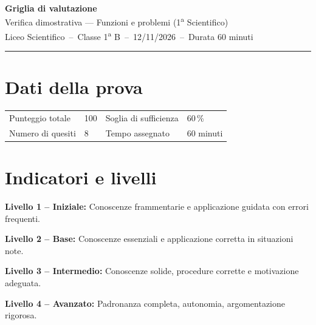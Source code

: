 \documentclass[11pt,a4paper]{article}
\begin{document}
\begin{center}
  {\Large\bfseries Griglia di valutazione}\\[2mm]
  {\large Verifica dimostrativa --- Funzioni e problemi (1\textsuperscript{a} Scientifico)}\\[1.5mm]
  {\small Liceo Scientifico\ --\ Classe 1\textsuperscript{a} B\ --\ 12/11/2026\ --\ Durata 60 minuti}
\end{center}
\vspace{1mm}
\noindent\rule{\linewidth}{0.4pt}

\section*{Dati della prova}
\begin{center}
\begin{tabular}{@{}llll@{}}
\toprule
Punteggio totale & 100 & Soglia di sufficienza & 60\,\% \\
Numero di quesiti & 8 & Tempo assegnato & 60 minuti \\
\bottomrule
\end{tabular}
\end{center}

\section*{Indicatori e livelli}

\noindent\textbf{Livello 1 -- Iniziale:} \small Conoscenze frammentarie e applicazione guidata con errori frequenti.\normalsize\par\vspace{1mm}

\noindent\textbf{Livello 2 -- Base:} \small Conoscenze essenziali e applicazione corretta in situazioni note.\normalsize\par\vspace{1mm}

\noindent\textbf{Livello 3 -- Intermedio:} \small Conoscenze solide, procedure corrette e motivazione adeguata.\normalsize\par\vspace{1mm}

\noindent\textbf{Livello 4 -- Avanzato:} \small Padronanza completa, autonomia, argomentazione rigorosa.\normalsize\par\vspace{1mm}
\end{document}

